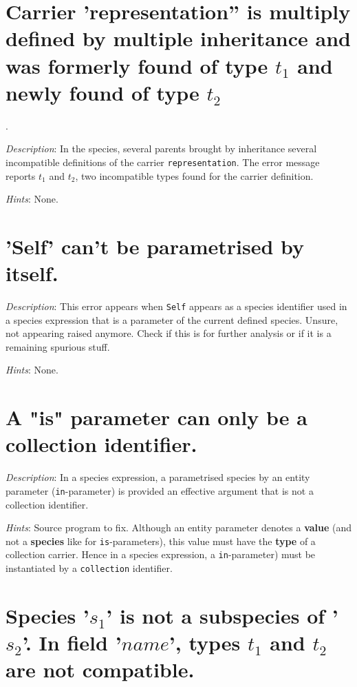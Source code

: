 \section*{Carrier 'representation'' is multiply defined by multiple inheritance and
  was formerly found of type $t_1$ and newly found of type $t_2$}.

{\em Description}: In the species, several parents brought by
inheritance several incompatible definitions of the carrier
{\tt representation}. The error message reports $t_1$ and $t_2$, two incompatible
types found for the carrier definition.

{\em Hints}: None.



\section*{'Self' can't be parametrised by itself.}

{\em Description}: This error appears when {\tt Self} appears as a
species identifier used in a species expression that is a parameter of
the current defined species.
{\color{red} Unsure, not appearing raised anymore. Check if this is
  for further analysis or if it is a remaining spurious stuff.}

{\em Hints}: None.



\section*{A "is" parameter can only be a collection identifier.}

{\em Description}: In a species expression, a parametrised species by
an entity parameter ({\tt in}-parameter) is provided an effective
argument that is not a collection identifier.

{\em Hints}: Source program to fix. Although an entity parameter
denotes a {\bf value} (and not a {\bf species} like for
{\tt is}-parameters), this value must have the {\bf type} of a
collection carrier. Hence in a species expression, a
{\tt in}-parameter) must be instantiated by a {\tt collection}
identifier.


\section*{Species '$s_1$' is not a subspecies of '$s_2$'. In field
  '$name$', types $t_1$ and $t_2$ are not compatible.}

